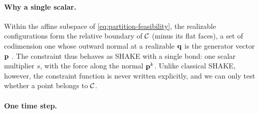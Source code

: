 \documentclass[main.tex]{subfiles}
\begin{document}
\paragraph{Why a single scalar.}
Within the affine subspace of \eqref{eq:partition-feasibility}, the realizable configurations form the relative boundary of $\mathcal{C}$ (minus its flat faces), a set of codimension one whose outward normal at a realizable $\mathbf{q}$ is the generator vector $\mathbf{p}$ \cite[Prop.~3.5]{Bourne2026ConvexOrder}.
The constraint thus behaves as SHAKE with a single bond: one scalar multiplier $s$, with the force along the normal $\mathbf{p}^k$.
Unlike classical SHAKE, however, the constraint function is never written explicitly, and we can only test whether a point belongs to $\mathcal{C}$.

\paragraph{One time step.}
\end{document}
